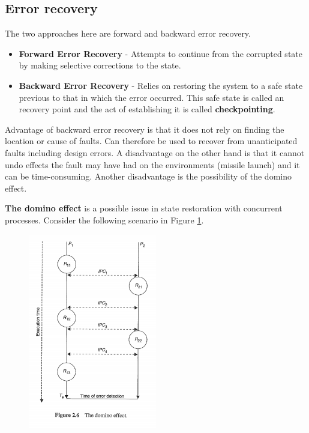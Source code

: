 \subsection{Error recovery}
The two approaches here are forward and backward error recovery.
\begin{itemize}
\item \textbf{Forward Error Recovery} - Attempts to continue from the corrupted state by making selective corrections to the state.
\item \textbf{Backward Error Recovery} - Relies on restoring the system to a safe state previous to that in which the error occurred. This safe state is called an recovery point and the act of establishing it is called \textbf{checkpointing}.
\end{itemize}

Advantage of backward error recovery is that it does not rely on finding the location or cause of faults. Can therefore be used to recover from unanticipated faults including design errors. A disadvantage on the other hand is that it cannot undo effects the fault may have had on the environments (missile launch) and it can be time-consuming. Another disadvantage is the possibility of the domino effect.

\textbf{The domino effect} is a possible issue in state restoration with concurrent processes. Consider the following scenario in Figure \ref{fig: domino_effect}. 

\begin{figure}[H]
\centering
\includegraphics[width=0.5\textwidth]{figures/Fault_Tolerance/domino_effect.PNG}
\label{fig: domino_effect}
\end{figure}

